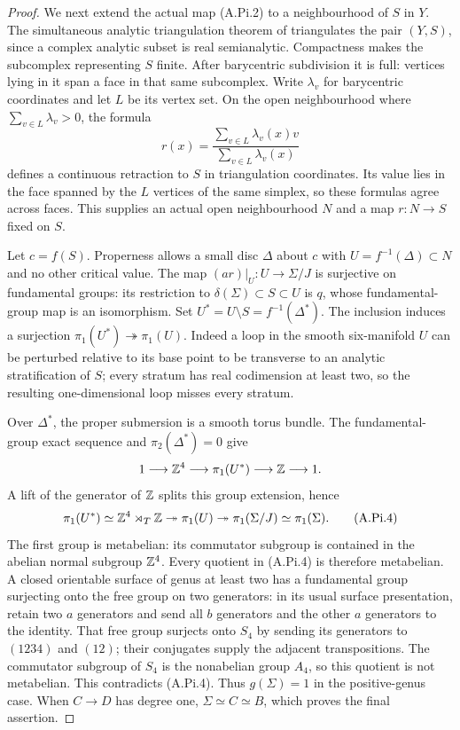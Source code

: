 \begin{proof}
We next extend the actual map (A.Pi.2) to a neighbourhood
of $S$ in $Y$. The simultaneous analytic triangulation
theorem of \cite[\S3, Theorem~2, p.~464]{Lojasiewicz1964}
triangulates the pair $(Y,S)$, since a complex analytic
subset is real semianalytic. Compactness makes the
subcomplex representing $S$ finite. After barycentric
subdivision it is full: vertices lying in it span a
face in that same subcomplex. Write $\lambda_v$ for
barycentric coordinates and let $L$ be its vertex set.
On the open neighbourhood where $\sum_{v\in L}\lambda_v>0$,
the formula
\[
 r(x)=\frac{\sum_{v\in L}\lambda_v(x)v}
                  {\sum_{v\in L}\lambda_v(x)}       \tag{A.Pi.3}
\]
defines a continuous retraction to $S$ in triangulation
coordinates. Its value lies in the face spanned by the
$L$ vertices of the same simplex, so these formulas
agree across faces. This supplies an actual open
neighbourhood $N$ and a map $r:N\to S$ fixed on $S$.

Let $c=f(S)$. Properness allows a small disc $\Delta$
about $c$ with $U=f^{-1}(\Delta)\subset N$ and no other
critical value. The map $(ar)|_U:U\to\Sigma/J$ is
surjective on fundamental groups: its restriction to
$\delta(\Sigma)\subset S\subset U$ is $q$, whose
fundamental-group map is an isomorphism.
Set $U^*=U\setminus S=f^{-1}(\Delta^*)$.
The inclusion induces a surjection
$\pi_1(U^*)\twoheadrightarrow\pi_1(U)$.
Indeed a loop in the smooth six-manifold $U$ can be
perturbed relative to its base point to be transverse
to an analytic stratification of $S$; every stratum
has real codimension at least two, so the resulting
one-dimensional loop misses every stratum.

Over $\Delta^*$, the proper submersion is a smooth
torus bundle. The fundamental-group exact sequence
and $\pi_2(\Delta^*)=0$ give
\[
 1\longrightarrow\mathbb Z^4\longrightarrow\pi_1(U^*)
       \longrightarrow\mathbb Z\longrightarrow1.
\]
A lift of the generator of $\mathbb Z$ splits this group
extension, hence
\[
 \pi_1(U^*)\simeq\mathbb Z^4\rtimes_T\mathbb Z
 \twoheadrightarrow\pi_1(U)
 \twoheadrightarrow\pi_1(\Sigma/J)
 \simeq\pi_1(\Sigma).                             \tag{A.Pi.4}
\]
The first group is metabelian: its commutator subgroup
is contained in the abelian normal subgroup $\mathbb Z^4$.
Every quotient in (A.Pi.4) is therefore metabelian.
A closed orientable surface of genus at least two
has a fundamental group surjecting onto the free
group on two generators: in its usual surface
presentation, retain two $a$ generators and send all
$b$ generators and the other $a$ generators to the
identity. That free group surjects onto $S_4$ by
sending its generators to $(1234)$ and $(12)$;
their conjugates supply the adjacent transpositions.
The commutator subgroup of $S_4$ is the nonabelian
group $A_4$, so this quotient is not metabelian.
This contradicts (A.Pi.4). Thus $g(\Sigma)=1$ in the
positive-genus case. When $C\to D$ has degree one,
$\Sigma\simeq C\simeq B$, which proves the final
assertion.
\end{proof}



